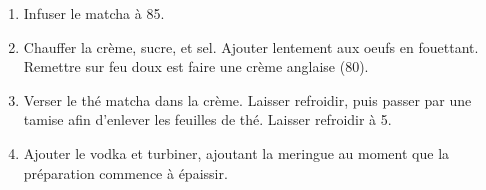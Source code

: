 

\begin{ingredients}
\end{ingredients}


\begin{recipe}
  \begin{enumerate}

  \item Infuser le matcha à 85\degreeC.
    
  \item Chauffer la crème, sucre, et sel.  Ajouter lentement aux oeufs
    en fouettant.  Remettre sur feu doux est faire une crème anglaise
    (80\degreeC).

  \item Verser le thé matcha dans la crème.  Laisser refroidir, puis
    passer par une tamise afin d'enlever les feuilles de thé.  Laisser
    refroidir à 5\degreeC.
    
  \item Ajouter le vodka et turbiner, ajoutant la meringue au moment
    que la préparation commence à épaissir.

  \end{enumerate}
\end{recipe}


